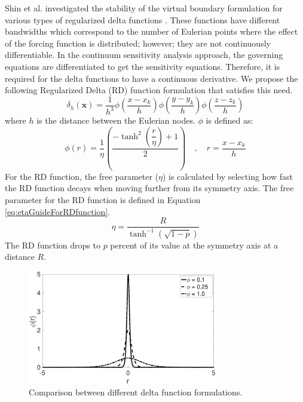 \documentclass[12pt]{aiaa-pretty}
\begin{document}
%
Shin et al. investigated the stability of the virtual boundary formulation for various types of regularized delta functions \cite{shin2008assessment}. These functions have different bandwidths which correspond to the number of Eulerian points where the effect of the forcing function is distributed; however; they are not continuously differentiable. In the continuum sensitivity analysis approach, the governing equations are differentiated to get the sensitivity equations. Therefore, it is required for the delta functions to have a continuous derivative. We propose the following Regularized Delta (RD) function formulation that satisfies this need.
%
\begin{equation}\label{eq:heavisideFunction}
	\delta_h(\mathbf{x}) = \frac{1}{h^3} \phi \left( \frac{x - x_k}{h} \right)
									 \phi \left( \frac{y - y_k}{h} \right)
									 \phi \left( \frac{z - z_k}{h} \right)
\end{equation}
%
where $h$ is the distance between the Eulerian nodes. $\phi$ is defined as:
%
\begin{equation}\label{eq:continuousDeltaFunction}
	\phi(r) = \dfrac{1}{\eta} \left( \dfrac{-\tanh^{2}{\left (\dfrac{r}{\eta} \right )} + 1}{2} \right)
	               \quad , \quad 
	               r = \frac{x - x_k}{h}
\end{equation}
%
For the RD function, the free parameter ($\eta$) is calculated by selecting how fast the RD function decays when moving further from its symmetry axis. The free parameter for the RD function is defined in Equation \eqref{eq:etaGuideForRDfunction}.
%
\begin{equation}\label{eq:etaGuideForRDfunction}
    \eta = \frac{R}{\tanh^{-1} (\sqrt{1 - p})}
\end{equation}
%
The RD function drops to $p$ percent of its value at the symmetry axis at a distance $R$. %
%
\begin{figure}[H]
	\centering
	\includegraphics[height=5.0cm]{figure/heaviside_comparison.eps}
	\caption{Comparison between different delta function formulations.}
	\label{fig:heavisideComparison}
\end{figure}
\end{document}
